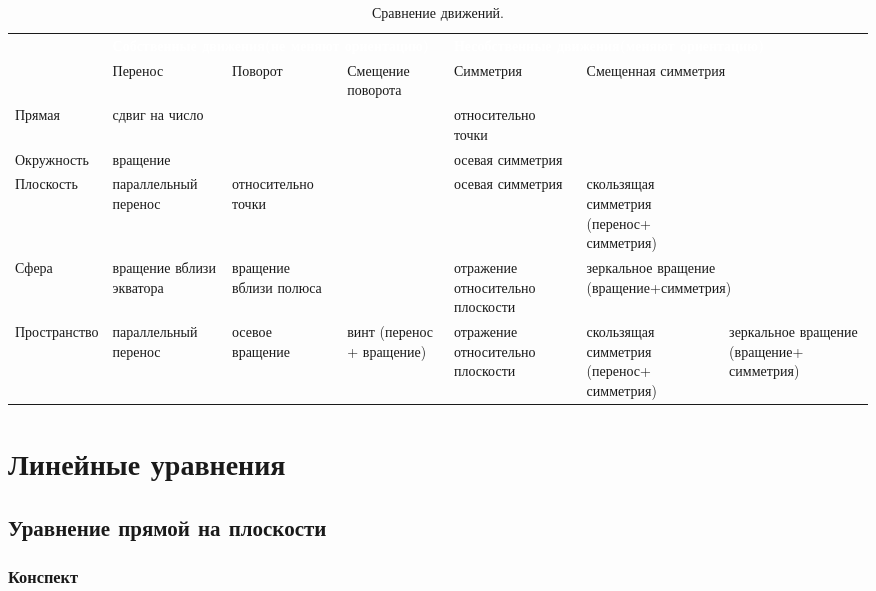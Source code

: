 \begin{table}
\caption{Сравнение движений.}
\label{Transitions}
\begin{tabular}{p{2cm}|p{2.5cm}p{2.5cm}p{2.5cm}p{2cm}p{2.5cm}p{2.5cm}}
\rowcolor{darkred}
& \multicolumn{3}{P{8.5cm}}{\textcolor{white}{\bfseries Собственные движения\linebreak (не меняют ориентацию)}} & \multicolumn{3}{P{8cm}}{\textcolor{white}{\bfseries Несобственные движения\linebreak (меняют ориентацию)}} \\ 
& Перенос & Поворот & Смещение поворота & Симметрия & \multicolumn{2}{p{5cm}}{Смещенная симметрия} \\ \hline \hline
Прямая     & сдвиг на число & & & относи\-тель\-но точки & & \\  \hline
Окруж\-ность & \multicolumn{2}{p{5cm}}{\centerline{вращение}} & & осевая симметрия & & \\ \hline
Плос\-кость  & параллель\-ный перенос & относи\-тель\-но точки & & осевая симметрия & скользящая симметрия (перенос+ сим\-мет\-рия) & \\  \hline
Сфера & вращение вблизи экватора & вращение вблизи полюса & & отражение относительно плоскости & \multicolumn{2}{p{5cm}}{зеркальное вращение (вращение+симметрия)} \\ \hline
Прост\-ранство & параллель\-ный перенос & осевое вращение & винт (перенос + вращение) & отражение относительно плоскости & скользящая симметрия (перенос+ сим\-мет\-рия) & зеркальное вращение (вращение+ сим\-мет\-рия) \\ \hline \hline
\end{tabular}
\end{table}















\chapter{Линейные уравнения}

\section{Уравнение прямой на плоскости}

\subsection*{Конспект}

